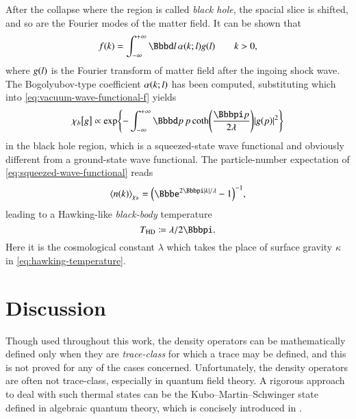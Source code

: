 After the collapse where the region is called \emph{black hole}, the spacial 
slice is shifted, and so are the Fourier modes of the matter field. It can be 
shown that
\begin{equation}
	\rfun{f}{k} = \int_{-\infty}^{+\infty} \dd l\,
	\rfun{\alpha}{k;l} \rfun{g}{l}\qquad k > 0,
\end{equation}
where ${g}\mathopen{}\left(l\right)\mathclose{}$ is the Fourier transform of matter field after the ingoing 
shock wave. The Bogolyubov-type coefficient ${\alpha}\mathopen{}\left(k;l\right)\mathclose{}$ has been 
computed, substituting which into \cref{eq:vacuum-wave-functional-f} yields
\begin{equation}
\sfun{\chi_b}{g} \propto 
\cfun{\exp}{-\int_{-\infty}^{+\infty}\dd p\, p \,\rfun{\coth}{\frac{\pp 
p}{2\lambda}} \vbr{\rfun{g}{p}}^2}
\label{eq:squeezed-wave-functional}
\end{equation}
in the black hole region, which is a squeezed-state wave functional 
\cite{Kiefer2001} and obviously different from a ground-state wave 
functional. The particle-number expectation of 
\cref{eq:squeezed-wave-functional} reads
\begin{equation}
	\abr{\rfun{n}{k}}_{\chi_b} = \rbr{\ee^{2\pp\vbr{k}/\lambda} - 1}^{-1},
	\label{eq:particle-num-exp-dilaton}
\end{equation}
leading to a Hawking-like \emph{black-body} temperature
\begin{equation}
T_\text{HD} \coloneqq \lambda/2\pp.
\label{eq:hawking-dilaton-temperature}
\end{equation}
Here it is the cosmological constant $\lambda$ which takes the place of surface 
gravity $\kappa$ in \cref{eq:hawking-temperature}.

\section{Discussion}
\label{sec:hawrad-discussion}

Though used throughout this work, the density operators can be mathematically 
defined only when they are \emph{trace-class} for which a trace may be defined, 
and this is not proved for any of the cases concerned. Unfortunately, the 
density operators are often not trace-class, especially in quantum field 
theory. A rigorous approach to deal with such thermal states can be the 
Kubo--Martin--Schwinger state \cite{Kubo1957,Martin1959,Haag1967} defined in 
algebraic quantum theory, which is concisely introduced in 
\cite[ch.~3]{David2015}.

